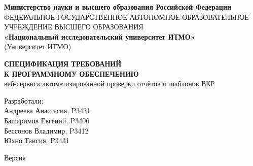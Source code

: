 

\thispagestyle{titlepage}
\pagestyle{empty}

\begin{center}
\vspace*{-1.5em}

\textbf{Министерство науки и высшего образования Российской Федерации}\\[0.8em]
{\small ФЕДЕРАЛЬНОЕ ГОСУДАРСТВЕННОЕ АВТОНОМНОЕ ОБРАЗОВАТЕЛЬНОЕ УЧРЕЖДЕНИЕ ВЫСШЕГО ОБРАЗОВАНИЯ}\\[0.5em]
\textbf{«Национальный исследовательский университет ИТМО»}\\[0.1em]
(Университет ИТМО)\\[2em]

\end{center}

\begin{center}

\vfill

{\bfseries\Large СПЕЦИФИКАЦИЯ ТРЕБОВАНИЙ}\\[0.3em]
{\bfseries\Large К ПРОГРАММНОМУ ОБЕСПЕЧЕНИЮ}\\[1em]
веб-сервиса автоматизированной проверки отчётов и шаблонов ВКР\\[3em]

\vfill

\end{center}

\begin{flushright}
\small

Разработали:\\
Андреева Анастасия, P3431\\
Башаримов Евгений, P3406\\
Бессонов Владимир, P3412\\
Юхно Таисия, P3431\\[2em]

\end{flushright}

\begin{center}
\small

Версия \srdversion\\[0.5em]
\srddate

\end{center}

\restoregeometry

\clearpage
\pagestyle{fancy}
